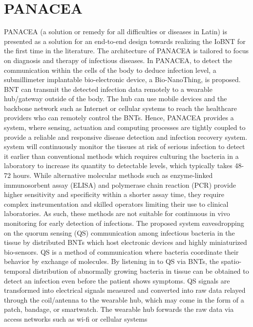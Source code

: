 \documentclass[12pt,a4paper]{report}
\begin{document}
\section{PANACEA}
PANACEA (a solution or remedy for all difficulties or diseases 
in Latin) is presented as a solution for an end-to-end design 
towards realizing the IoBNT for the first time in the literature. 
The architecture of PANACEA is tailored to focus on diagnosis and 
therapy of infectious diseases. In PANACEA, to detect the 
communication within the cells of the body to deduce infection 
level, a submillimeter implantable bio-electronic device, a 
Bio-NanoThing, is proposed. BNT can transmit the detected 
infection data remotely to a wearable hub/gateway outside of the body. 
The hub can use mobile devices and the backbone network such as 
Internet or cellular systems to reach the healthcare providers 
who can remotely control the BNTs. Hence, PANACEA provides a system, 
where sensing, actuation and computing processes are tightly coupled 
to provide a reliable and responsive disease detection and infection 
recovery system. system will continuously monitor the tissues at risk 
of serious infection to detect it earlier than conventional methods
 which requires culturing the bacteria in a laboratory to increase 
 its quantity to detectable levels, which typically takes 48-72 hours.
 While alternative molecular methods such as enzyme-linked immunosorbent 
 assay (ELISA) and polymerase chain reaction (PCR) provide higher 
 sensitivity and specificity within a shorter assay time, they 
 require complex instrumentation and skilled operators limiting 
 their use to clinical laboratories. As such, these methods are 
 not suitable for continuous in vivo monitoring for early detection 
 of infections. The proposed system eavesdropping on the quorum 
 sensing (QS) communication among infectious bacteria in the tissue 
 by distributed BNTs which host electronic devices and highly 
 miniaturized bio-sensors. QS is a method of communication where 
 bacteria coordinate their behavior by exchange of molecules. 
 By listening in to QS via BNTs, the spatio-temporal distribution
 of abnormally growing bacteria in tissue can be obtained to 
 detect an infection even before the patient shows symptoms. 
 QS signals are transformed into electrical signals measured 
 and converted into raw data relayed through the coil/antenna
  to the wearable hub, which may come in the form of a patch,
   bandage, or smartwatch. The wearable hub forwards the raw 
   data via access networks such as wi-fi or cellular systems
\end{document}
